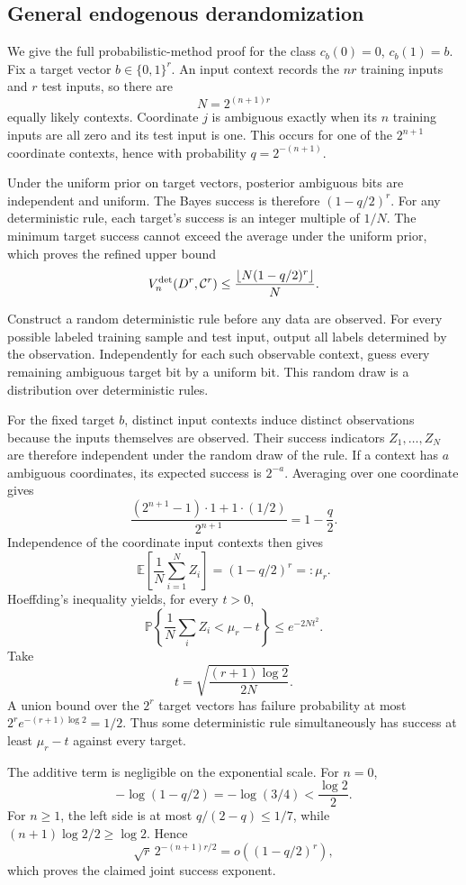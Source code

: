 \documentclass[twoside]{article}
\newcommand{\E}{\mathbb E}
\newcommand{\Prb}{\mathbb P}
\newcommand{\cC}{\mathcal C}
\begin{document}
\subsection{General endogenous derandomization}
\label{app:det-general}

We give the full probabilistic-method proof for the class $c_b(0)=0$, $c_b(1)=b$. Fix a target vector $b\in\{0,1\}^r$. An input context records the $nr$ training inputs and $r$ test inputs, so there are
\[
N=2^{(n+1)r}
\]
equally likely contexts. Coordinate $j$ is ambiguous exactly when its $n$ training inputs are all zero and its test input is one. This occurs for one of the $2^{n+1}$ coordinate contexts, hence with probability $q=2^{-(n+1)}$.

Under the uniform prior on target vectors, posterior ambiguous bits are independent and uniform. The Bayes success is therefore $(1-q/2)^r$. For any deterministic rule, each target's success is an integer multiple of $1/N$. The minimum target success cannot exceed the average under the uniform prior, which proves the refined upper bound
\[
V_n^{\rm det}(D^r,\cC^r)\leq\frac{\lfloor N(1-q/2)^r\rfloor}{N}.
\]

Construct a random deterministic rule before any data are observed. For every possible labeled training sample and test input, output all labels determined by the observation. Independently for each such observable context, guess every remaining ambiguous target bit by a uniform bit. This random draw is a distribution over deterministic rules.

For the fixed target $b$, distinct input contexts induce distinct observations because the inputs themselves are observed. Their success indicators $Z_1,\ldots,Z_N$ are therefore independent under the random draw of the rule. If a context has $a$ ambiguous coordinates, its expected success is $2^{-a}$. Averaging over one coordinate gives
\[
\frac{(2^{n+1}-1)\cdot1+1\cdot(1/2)}{2^{n+1}}=1-\frac{q}{2}.
\]
Independence of the coordinate input contexts then gives
\[
\E\left[\frac1N\sum_{i=1}^NZ_i\right]=(1-q/2)^r=:\mu_r.
\]
Hoeffding's inequality yields, for every $t>0$,
\[
\Prb\left\{\frac1N\sum_iZ_i<\mu_r-t\right\}\leq e^{-2Nt^2}.
\]
Take
\[
t=\sqrt{\frac{(r+1)\log2}{2N}}.
\]
A union bound over the $2^r$ target vectors has failure probability at most $2^re^{-(r+1)\log2}=1/2$. Thus some deterministic rule simultaneously has success at least $\mu_r-t$ against every target.

The additive term is negligible on the exponential scale. For $n=0$,
\[
-\log(1-q/2)=-\log(3/4)<\frac{\log2}{2}.
\]
For $n\geq1$, the left side is at most $q/(2-q)\leq1/7$, while $(n+1)\log2/2\geq\log2$. Hence
\[
\sqrt r\,2^{-(n+1)r/2}=o((1-q/2)^r),
\]
which proves the claimed joint success exponent.
\end{document}
